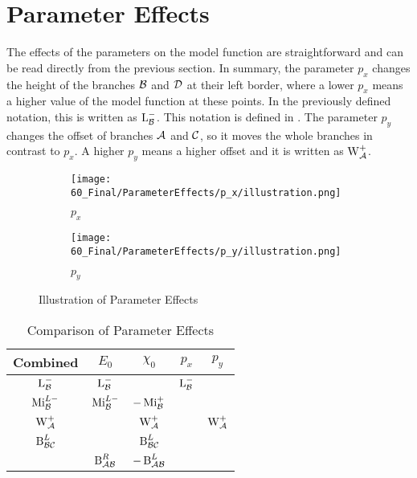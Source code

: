 \section{Parameter Effects}

The effects of the parameters on the model function are straightforward and can be read directly from the previous section.
In summary, the parameter $p_x$ changes the height of the branches $\mathcal{B}$ and $\mathcal{D}$ at their left border, where a lower $p_x$ means a higher value of the model function at these points.
In the previously defined notation, this is written as $\operatorname{L}_{\mathcal{B}}^-$.
This notation is defined in .
The parameter $p_y$ changes the offset of branches $\mathcal{A}$ and $\mathcal{C}$, so it moves the whole branches in contrast to $p_x$.
A higher $p_y$ means a higher offset and it is written as $\operatorname{W}_{\mathcal{A}}^+$.


\begin{figure}
    \centering
    \begin{subfigure}{0.4\textwidth}
        \centering
        \texttt{[image: 60\_Final/ParameterEffects/p\_x/illustration.png]}
        \caption{$p_x$}
        \label{fig:final.param.effects.px}
    \end{subfigure}
    \begin{subfigure}{0.4\textwidth}
        \centering
        \texttt{[image: 60\_Final/ParameterEffects/p\_y/illustration.png]}
        \caption{$p_y$}
        \label{fig:final.param.effects.py}
    \end{subfigure}
    \caption{Illustration of Parameter Effects}
\end{figure}


\begin{table}
    \centering
    \begin{tabular}{|c||c|c||c|c|} \hline
        Combined         & $E_0$            & $\chi_0$          & $p_x$        & $p_y$          \\ \hline \hline
        $\operatorname{L}_{\mathcal{B}}^{-}$   & $\operatorname{L}_{\mathcal{B}}^{-}$   &                   & $\operatorname{L}_{\mathcal{B}}^-$ &                \\ \hline
        $\operatorname{Mi}_{\mathcal{B}}^{L-}$ & $\operatorname{Mi}_{\mathcal{B}}^{L-}$ & $-\operatorname{Mi}_{\mathcal{B}}^{+}$  &              &                \\ \hline
        $\operatorname{W}_{\mathcal{A}}^{+}$   &                  & $\operatorname{W}_{\mathcal{A}}^{+}$    &              & $\operatorname{W}_{\mathcal{A}}^{+}$ \\ \hline \hline
        $\operatorname{B}_{\mathcal{B}\mathcal{C}}^{L}$ &                  & $\operatorname{B}_{\mathcal{B}\mathcal{C}}^{L}$  &              &                \\ \hline
                         & $\operatorname{B}_{\mathcal{A}\mathcal{B}}^{R}$ & $-\operatorname{B}_{\mathcal{A}\mathcal{B}}^{L}$ &              &                \\ \hline
    \end{tabular}
    \caption{Comparison of Parameter Effects}
    \label{tab:final.def.parameters.effects}
\end{table}

